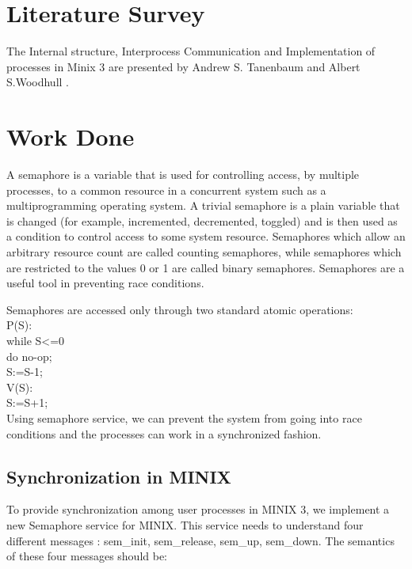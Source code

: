\documentclass[a4paper,11pt,twocolumn]{article}
\begin{document}
\section{Literature Survey }
The Internal structure, Interprocess Communication and Implementation of processes in Minix 3 are presented by Andrew S. Tanenbaum and Albert S.Woodhull \cite{much}.
\section{Work Done}
A semaphore is a variable that is used for controlling access, by multiple processes, to a common resource in a concurrent system such as a multiprogramming operating system. A trivial semaphore is a plain variable that is changed (for example, incremented, decremented, toggled)  and is then used as a condition to control access to some system resource. Semaphores which allow an arbitrary resource count are called counting semaphores, while semaphores which are restricted to the values 0 or 1 are called binary semaphores. Semaphores are a useful tool in preventing race conditions.

Semaphores are accessed only through two standard atomic operations:\\


	P(S):\\
		while S\textless=0\\
		do no-op;\\
		S:=S-1;\\
	V(S):\\
		S:=S+1;\\
Using semaphore service, we can prevent the system from going into race conditions and the processes can work in a synchronized fashion.

\subsection{Synchronization in MINIX}
To provide synchronization among user processes in MINIX 3, we implement a new Semaphore service for MINIX. This service needs to understand four different messages : sem\_init, sem\_release, sem\_up, sem\_down. The semantics of these four messages should be:
\end{document}
